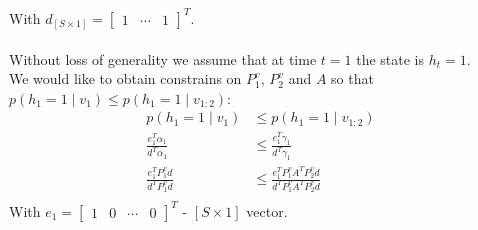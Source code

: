 \documentclass[oneside,12pt]{article}
\begin{document}
%
With $d_{[S \times 1]} = \begin{bmatrix} 1& \cdots& 1\end{bmatrix}^T$.\\\\
%
Without loss of generality we assume that at time $t=1$ the state is $h_t=1$.\\We would like to obtain constrains on $P^v_1$, $P^v_2$ and $A$ so that $p(h_1=1 \mid v_{1}) \leq p(h_1=1 \mid v_{1:2})$:
%
\begin{equation}\label{eq:f_vs_s}
    \begin{split}
        p(h_1=1 \mid v_{1}) &\leq p(h_1=1 \mid v_{1:2})\\
        \frac{e_1^T\alpha_1}{d^T\alpha_1} &\leq \frac{e_1^T\gamma_1}{d^T\gamma_1}\\
        \frac{e_1^T P^v_1 d}{d^T P^v_1 d} &\leq \frac{e_1^T P^v_1 A^T P^v_{2} d}{d^T P^v_1 A^T P^v_{2} d}\\
    \end{split}
\end{equation}
%
With $e_1 = \begin{bmatrix} 1& 0 & \cdots& 0 \end{bmatrix}^T$ - $[S \times 1]$ vector.
%
%
\end{document}
